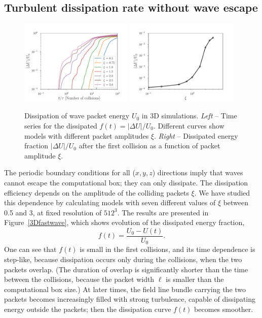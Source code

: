 \subsection{Turbulent dissipation rate without wave escape}
%
\begin{figure}
\centering
\includegraphics[width=0.48\textwidth]{pics/chap4/casrate3D}
\includegraphics[width=0.48\textwidth]{pics/chap4/dis_col}
\caption[Dissipation of \alfven wave packet energy $U_0$ in 3D simulations]{Dissipation of \alfven wave packet energy $U_0$ in 3D simulations.
\textit{Left} -- Time series for the dissipated $f(t)=|\Delta U|/U_0$. Different curves show models with different packet amplitudes $\xi$.
\textit{Right} -- Dissipated energy fraction $|\Delta U|/U_0$ after the first collision as a function of packet amplitude $\xi$.
}
\label{casraterate3D}
\end{figure}
%
The periodic boundary conditions for all ($x,y,z$) directions imply that waves cannot escape the computational box; they can only dissipate. The dissipation efficiency depends on the amplitude of the colliding \alfven packets $\xi$. We have studied this dependence by calculating models with seven different values of $\xi$ between 0.5 and $3$, at fixed resolution of $512^3$. The results are presented in Figure~\ref{3Dfastwave}, which shows evolution of the dissipated energy fraction,
\begin{equation}
  f(t)=\frac{U_0-U(t)}{U_0}.
\end{equation}
One can see that $f(t)$ is small in the first collisions, and its time dependence is step-like, because dissipation occurs only during the collisions,
when the two packets overlap. (The  duration of overlap is significantly shorter than the time between the collisions, because the packet width $\ell$ is smaller than the computational box size.) At later times, the field line bundle carrying the two packets becomes increasingly filled with strong \alfven turbulence, capable of dissipating energy outside the packets; then the dissipation curve $f(t)$ becomes smoother.

